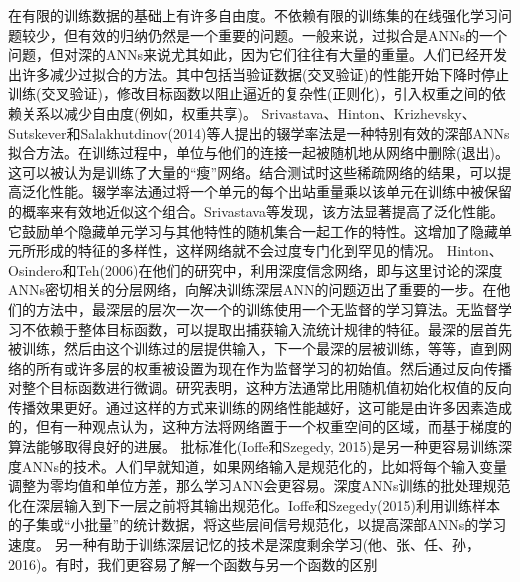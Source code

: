 {在有限的训练数据的基础上有许多自由度。不依赖有限的训练集的在线强化学习问题较少，但有效的归纳仍然是一个重要的问题。一般来说，过拟合是ANNs的一个问题，但对深的ANNs来说尤其如此，因为它们往往有大量的重量。人们已经开发出许多减少过拟合的方法。其中包括当验证数据(交叉验证)的性能开始下降时停止训练(交叉验证)，修改目标函数以阻止逼近的复杂性(正则化)，引入权重之间的依赖关系以减少自由度(例如，权重共享)。
Srivastava、Hinton、Krizhevsky、Sutskever和Salakhutdinov(2014)等人提出的辍学率法是一种特别有效的深部ANNs拟合方法。在训练过程中，单位与他们的连接一起被随机地从网络中删除(退出)。这可以被认为是训练了大量的“瘦”网络。结合测试时这些稀疏网络的结果，可以提高泛化性能。辍学率法通过将一个单元的每个出站重量乘以该单元在训练中被保留的概率来有效地近似这个组合。Srivastava等发现，该方法显著提高了泛化性能。它鼓励单个隐藏单元学习与其他特性的随机集合一起工作的特性。这增加了隐藏单元所形成的特征的多样性，这样网络就不会过度专门化到罕见的情况。
Hinton、Osindero和Teh(2006)在他们的研究中，利用深度信念网络，即与这里讨论的深度ANNs密切相关的分层网络，向解决训练深层ANN的问题迈出了重要的一步。在他们的方法中，最深层的层次一次一个的训练使用一个无监督的学习算法。无监督学习不依赖于整体目标函数，可以提取出捕获输入流统计规律的特征。最深的层首先被训练，然后由这个训练过的层提供输入，下一个最深的层被训练，等等，直到网络的所有或许多层的权重被设置为现在作为监督学习的初始值。然后通过反向传播对整个目标函数进行微调。研究表明，这种方法通常比用随机值初始化权值的反向传播效果更好。通过这样的方式来训练的网络性能越好，这可能是由许多因素造成的，但有一种观点认为，这种方法将网络置于一个权重空间的区域，而基于梯度的算法能够取得良好的进展。
批标准化(Ioffe和Szegedy, 2015)是另一种更容易训练深度ANNs的技术。人们早就知道，如果网络输入是规范化的，比如将每个输入变量调整为零均值和单位方差，那么学习ANN会更容易。深度ANNs训练的批处理规范化在深层输入到下一层之前将其输出规范化。Ioffe和Szegedy(2015)利用训练样本的子集或“小批量”的统计数据，将这些层间信号规范化，以提高深部ANNs的学习速度。
另一种有助于训练深层记忆的技术是深度剩余学习(他、张、任、孙，2016)。有时，我们更容易了解一个函数与另一个函数的区别

}

